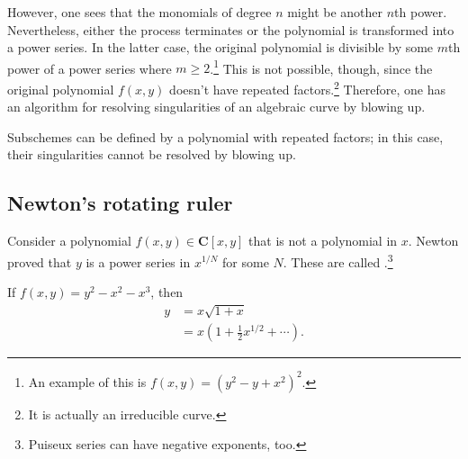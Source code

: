 \documentclass [11 pt, oneside] {article}
\begin{document}
However, one sees that the monomials of degree $n$ might be another $n$th power. Nevertheless, either the process terminates or the polynomial is transformed into a power series. In the latter case, the original polynomial is divisible by some $m$th power of a power series where $m\ge 2$.\footnote{An example of this is $f(x,y)= (y^2-y+x^2)^2$.} This is not possible, though, since the original polynomial $f(x,y)$ doesn't have repeated factors.\footnote{It is actually an irreducible curve.} Therefore, one has an algorithm for resolving singularities of an algebraic curve by blowing up.

\begin{remark}
	Subschemes can be defined by a polynomial with repeated factors; in this case, their singularities cannot be resolved by blowing up.
\end{remark}

\subsection{Newton's rotating ruler}
Consider a polynomial $f(x,y)\in  \mathbf{C}[x,y]$ that is not a polynomial in $x$. Newton proved that $y$ is a power series in $x^{1/N}$ for some $N$. These are called .\footnote{Puiseux series can have negative exponents, too.}

\begin{example}[ ]\label{}\text{}
If $f(x,y) = y^2-x^2 -x^3$, then
\begin{align*}
	y &= x\sqrt{1+x}\\
	  &= x \left( 1 + \frac{1}{2}x^{1/2} + \cdots \right). 
\end{align*}
\end{example}
\end{document}
